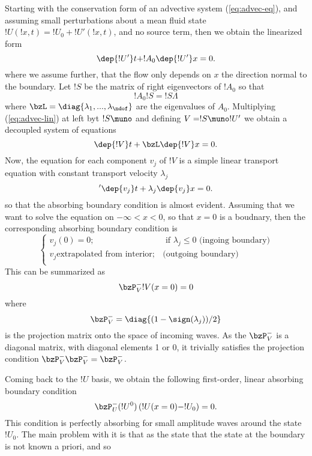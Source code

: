 Starting with the conservation form of an advective system
(\ref{eq:advec-eq}), and assuming small perturbations about a mean
fluid state $!U(!x,t) = !U_0 + !U'(!x,t)$, and no source term, then we
obtain the linearized form
%
\begin{equation} \label{eq:advec-lin}  
  \dep{!U'}t + !A_0\dep {!U'}x =0. 
\end{equation}
%
where we assume further, that the flow only depends on $x$ the
direction normal to the boundary. Let $!S$ be the matrix of
right eigenvectors of $!A_0$ so that
%
\begin{equation} 
  !A_0!S = !S\Lambda
\end{equation}
%
where $\bzL = \diag\{\lambda_1,...,\lambda_\ndof\}$ are the
eigenvalues of $A_0$. Multiplying (\ref{eq:advec-lin}) at left byt
$!S\muno$ and defining $V=!S\muno !U'$ we obtain a decoupled system of
equations
%
\begin{equation}
  \dep{!V}t + \bzL\dep {!V}x =0. 
\end{equation}
%
Now, the equation for each component $v_j$ of $!V$ is a simple linear
transport equation with constant transport velocity $\lambda_j$
%
\begin{equation} '
  \dep{v_j}t + \lambda_j\dep {v_j}x =0. 
\end{equation}
%
so that the absorbing boundary condition is almost evident. Assuming
that we want to solve the equation on $-\infty<x<0$, so that $x=0$ is
a boudnary, then the corresponding absorbing boundary condition is
%
\begin{equation} 
  \begin{cases}
    v_j(0) = 0; & \text{ if $\lambda_j\le 0$ (ingoing boundary)}\\
    v_j \textrm{extrapolated from interior}; & \text{(outgoing boundary)}\\
  \end{cases}
\end{equation}
%
This can be summarized as
%
\begin{equation} 
  \bzP_V^- !V(x=0) = 0
\end{equation}
%
where 
%
\begin{equation} 
  \bzP_V^- = \diag\{(1-\sign(\lambda_j))/2\}
\end{equation}
%
is the projection matrix onto the space of incoming waves. As the
$\bzP_V^-$ is a diagonal matrix, with diagonal elements 1 or 0, it
trivially satisfies the projection condition $\bzP_V^- \bzP_V^- =
\bzP_V^-$. 

Coming back to the $!U$ basis, we obtain the following first-order,
linear absorbing boundary condition
%
\begin{equation} 
  \bzP_U^-(!U^0) \, (!U(x=0)-!U_0) = 0. 
\end{equation}
%
This condition is perfectly absorbing for small amplitude waves around
the state $!U_0$. The main problem with it is that as the state that
the state at the boundary is not known a priori, and so 



